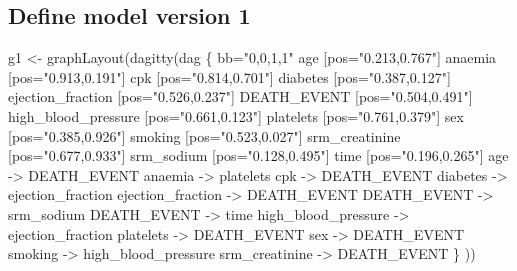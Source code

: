 \documentclass[
]{article}
\newenvironment{Shaded}{\begin{snugshade}}{\end{snugshade}}
\newcommand{\AttributeTok}[1]{\textcolor[rgb]{0.77,0.63,0.00}{#1}}
\newcommand{\DecValTok}[1]{\textcolor[rgb]{0.00,0.00,0.81}{#1}}
\newcommand{\FunctionTok}[1]{\textcolor[rgb]{0.00,0.00,0.00}{#1}}
\newcommand{\NormalTok}[1]{#1}
\newcommand{\OtherTok}[1]{\textcolor[rgb]{0.56,0.35,0.01}{#1}}
\newcommand{\SpecialCharTok}[1]{\textcolor[rgb]{0.00,0.00,0.00}{#1}}
\newcommand{\StringTok}[1]{\textcolor[rgb]{0.31,0.60,0.02}{#1}}
\begin{document}
\begin{Shaded}
\end{Shaded}

\normalsize
\newpage

\hypertarget{define-model-version-1}{%
\subsection{Define model version 1}\label{define-model-version-1}}

\tiny

\begin{Shaded}
\begin{Highlighting}[]
\NormalTok{g1 }\OtherTok{\textless{}{-}} \FunctionTok{graphLayout}\NormalTok{(}\FunctionTok{dagitty}\NormalTok{(}\StringTok{\textquotesingle{}dag \{}
\StringTok{bb="0,0,1,1"}
\StringTok{age [pos="0.213,0.767"]}
\StringTok{anaemia [pos="0.913,0.191"]}
\StringTok{cpk [pos="0.814,0.701"]}
\StringTok{diabetes [pos="0.387,0.127"]}
\StringTok{ejection\_fraction [pos="0.526,0.237"]}
\StringTok{DEATH\_EVENT [pos="0.504,0.491"]}
\StringTok{high\_blood\_pressure [pos="0.661,0.123"]}
\StringTok{platelets [pos="0.761,0.379"]}
\StringTok{sex [pos="0.385,0.926"]}
\StringTok{smoking [pos="0.523,0.027"]}
\StringTok{srm\_creatinine [pos="0.677,0.933"]}
\StringTok{srm\_sodium [pos="0.128,0.495"]}
\StringTok{time [pos="0.196,0.265"]}
\StringTok{age {-}\textgreater{} DEATH\_EVENT}
\StringTok{anaemia {-}\textgreater{} platelets}
\StringTok{cpk {-}\textgreater{} DEATH\_EVENT}
\StringTok{diabetes {-}\textgreater{} ejection\_fraction}
\StringTok{ejection\_fraction {-}\textgreater{} DEATH\_EVENT}
\StringTok{DEATH\_EVENT {-}\textgreater{} srm\_sodium}
\StringTok{DEATH\_EVENT {-}\textgreater{} time}
\StringTok{high\_blood\_pressure {-}\textgreater{} ejection\_fraction}
\StringTok{platelets {-}\textgreater{} DEATH\_EVENT}
\StringTok{sex {-}\textgreater{} DEATH\_EVENT}
\StringTok{smoking {-}\textgreater{} high\_blood\_pressure}
\StringTok{srm\_creatinine {-}\textgreater{} DEATH\_EVENT}
\StringTok{\}}
\StringTok{\textquotesingle{}}\NormalTok{))}
\end{Highlighting}
\end{Shaded}
\end{document}
